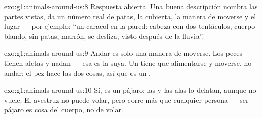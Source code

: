 \begin{solution}{exo:g1:animals-around-us:8}
Respuesta abierta. Una buena descripción nombra las partes vistas, da
un número real de patas, la cubierta, la manera de moverse y el lugar
--- por ejemplo: ``un caracol en la pared: cabeza con dos tentáculos,
cuerpo blando, sin patas,  marrón, se desliza; visto después de
la lluvia''.
\end{solution}

\begin{solution}{exo:g1:animals-around-us:9}
Andar es solo una manera de moverse. Los peces tienen aletas y nadan
--- esa es la suya. Un  tiene que alimentarse y moverse, no
andar: el pez hace las dos cosas, así que es un .
\end{solution}

\begin{solution}{exo:g1:animals-around-us:10}
Sí, es un pájaro: las  y las alas lo delatan, aunque no vuele.
El avestruz no puede volar, pero corre más que cualquier persona ---
ser pájaro es cosa del cuerpo, no de volar.
\end{solution}
